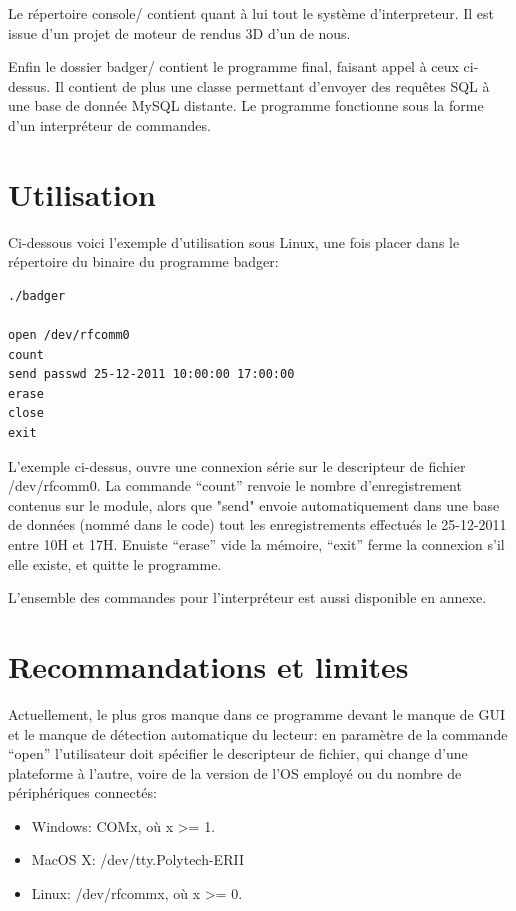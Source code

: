     Le répertoire console/ contient quant à lui tout le système d'interpreteur.
Il est issue d'un projet de moteur de rendus 3D d'un de nous.

    Enfin le dossier badger/ contient le programme final, faisant appel à ceux
ci-dessus. Il contient de plus une classe permettant d'envoyer des requêtes SQL
à une base de donnée MySQL distante. Le programme fonctionne sous la forme d'un 
interpréteur de commandes.





\section{Utilisation}
    Ci-dessous voici l'exemple d'utilisation sous Linux, une fois placer dans le
répertoire du binaire du programme badger:

    \begin{lstlisting}
./badger

open /dev/rfcomm0
count
send passwd 25-12-2011 10:00:00 17:00:00
erase
close
exit
    \end{lstlisting}

    L'exemple ci-dessus, ouvre une connexion série sur le descripteur de fichier
/dev/rfcomm0. La commande ``count'' renvoie le nombre d'enregistrement contenus sur 
le module, alors que "send" envoie automatiquement dans une base de données (nommé
dans le code) tout les enregistrements effectués le 25-12-2011 entre 10H et 17H.
Enuiste ``erase'' vide la mémoire, ``exit'' ferme la connexion s'il elle existe, et
quitte le programme.

    L'ensemble des commandes pour l'interpréteur est aussi disponible en annexe.




\section{Recommandations et limites}
    Actuellement, le plus gros manque dans ce programme devant le manque de GUI et
le manque de détection automatique du lecteur: en paramètre de la commande ``open''
l'utilisateur doit spécifier le descripteur de fichier, qui change d'une plateforme
à l'autre, voire de la version de l'OS employé ou du nombre de périphériques connectés:

    \begin{itemize}
        \item Windows: COMx, où x >= 1.
        \item MacOS X: /dev/tty.Polytech-ERII
        \item Linux: /dev/rfcommx, où x >= 0.
    \end{itemize}

